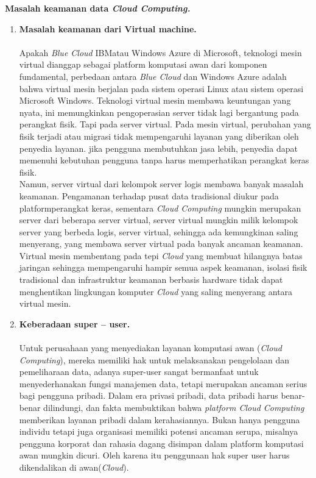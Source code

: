 \textbf{Masalah  keamanan data \textit{Cloud Computing.}}
\begin{enumerate}[label=\alph*]
\item \textbf{Masalah keamanan dari Virtual  machine.}\\\\
Apakah \textit{Blue Cloud} IBMatau Windows Azure di Microsoft, teknologi mesin virtual dianggap sebagai platform komputasi awan dari komponen fundamental, perbedaan antara \textit{Blue Cloud} dan Windows Azure adalah bahwa virtual mesin berjalan pada sistem operasi Linux atau sistem operasi Microsoft Windows. Teknologi virtual mesin membawa keuntungan yang nyata, ini memungkinkan pengoperasian server tidak lagi bergantung pada perangkat fisik. Tapi pada server virtual.  Pada  mesin virtual, perubahan yang fisik terjadi atau migrasi tidak  mempengaruhi layanan yang diberikan oleh penyedia layanan. jika pengguna membutuhkan jasa lebih, penyedia dapat memenuhi kebutuhan pengguna tanpa harus memperhatikan perangkat keras fisik.\\
\tab Namun, server virtual dari kelompok server logis membawa banyak masalah keamanan. Pengamanan terhadap pusat data tradisional diukur pada platformperangkat keras, sementara \textit{Cloud Computing} mungkin merupakan server dari   beberapa server virtual, server virtual mungkin milik kelompok server yang berbeda logis, server virtual, sehingga ada kemungkinan saling menyerang, yang membawa server virtual pada banyak ancaman keamanan.\\
Virtual mesin membentang pada tepi \textit{Cloud} yang membuat hilangnya batas jaringan sehingga mempengaruhi hampir semua aspek keamanan, isolasi fisik tradisional dan infrastruktur keamanan berbasis hardware tidak dapat menghentikan lingkungan komputer \textit{Cloud} yang saling menyerang antara virtual mesin.\\
\item \textbf{Keberadaan super – user.}\\\\
Untuk perusahaan yang menyediakan layanan komputasi awan (\textit{Cloud Computing}), mereka memiliki hak untuk melaksanakan pengelolaan dan pemeliharaan data, adanya super-user sangat bermanfaat untuk menyederhanakan fungsi manajemen data, tetapi merupakan  ancaman serius bagi pengguna pribadi. Dalam era privasi pribadi, data pribadi harus benar- benar dilindungi, dan fakta membuktikan bahwa \textit{platform  Cloud  Computing} memberikan layanan pribadi dalam kerahasiannya. Bukan hanya pengguna individu tetapi juga organisasi memiliki potensi ancaman serupa, misalnya pengguna korporat dan rahasia dagang disimpan dalam platform komputasi awan mungkin dicuri. Oleh karena itu penggunaan hak super user harus dikendalikan di awan(\textit{Cloud}).

\end{enumerate}
